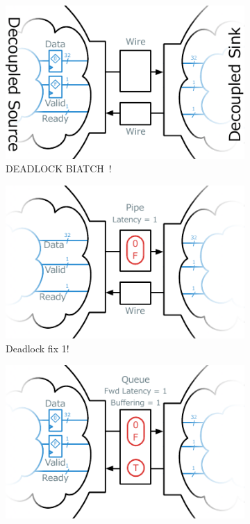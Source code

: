 \begin{figure}
    \centering
    \begin{subfigure}[t]{0.6\textwidth}
        \includegraphics[width=\textwidth]{figures/deadlock.pdf}
        \caption{DEADLOCK BIATCH~!}
        \label{fig:default-target}
    \end{subfigure}\vspace{0.5cm}
    \begin{subfigure}[t]{0.48\textwidth}
        \includegraphics[width=\textwidth]{figures/pipe-decoupled-example.pdf}
        \caption{Deadlock fix 1!}
        \label{fig:pipe-decoupled-example}
    \end{subfigure}\hspace{0.5cm}
    \begin{subfigure}[t]{0.48\textwidth}
        \includegraphics[width=\textwidth]{figures/queue-decoupled-example.pdf}

\end{subfigure}
\end{figure}
